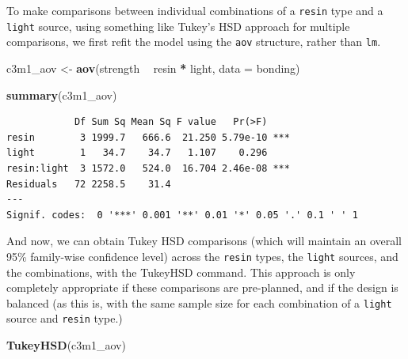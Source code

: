 \documentclass[]{book}
\newenvironment{Shaded}{\begin{snugshade}}{\end{snugshade}}
\newcommand{\KeywordTok}[1]{\textcolor[rgb]{0.13,0.29,0.53}{\textbf{#1}}}
\newcommand{\DataTypeTok}[1]{\textcolor[rgb]{0.13,0.29,0.53}{#1}}
\newcommand{\StringTok}[1]{\textcolor[rgb]{0.31,0.60,0.02}{#1}}
\newcommand{\OperatorTok}[1]{\textcolor[rgb]{0.81,0.36,0.00}{\textbf{#1}}}
\newcommand{\NormalTok}[1]{#1}
\theoremstyle{definition}
\theoremstyle{definition}
\theoremstyle{definition}
\theoremstyle{remark}
\begin{document}
To make comparisons between individual combinations of a \texttt{resin}
type and a \texttt{light} source, using something like Tukey's HSD
approach for multiple comparisons, we first refit the model using the
\texttt{aov} structure, rather than \texttt{lm}.

\begin{Shaded}
\begin{Highlighting}[]
\NormalTok{c3m1_aov <-}\StringTok{ }\KeywordTok{aov}\NormalTok{(strength }\OperatorTok{~}\StringTok{ }\NormalTok{resin }\OperatorTok{*}\StringTok{ }\NormalTok{light, }\DataTypeTok{data =}\NormalTok{ bonding)}

\KeywordTok{summary}\NormalTok{(c3m1_aov)}
\end{Highlighting}
\end{Shaded}

\begin{verbatim}
            Df Sum Sq Mean Sq F value   Pr(>F)    
resin        3 1999.7   666.6  21.250 5.79e-10 ***
light        1   34.7    34.7   1.107    0.296    
resin:light  3 1572.0   524.0  16.704 2.46e-08 ***
Residuals   72 2258.5    31.4                     
---
Signif. codes:  0 '***' 0.001 '**' 0.01 '*' 0.05 '.' 0.1 ' ' 1
\end{verbatim}

And now, we can obtain Tukey HSD comparisons (which will maintain an
overall 95\% family-wise confidence level) across the \texttt{resin}
types, the \texttt{light} sources, and the combinations, with the
TukeyHSD command. This approach is only completely appropriate if these
comparisons are pre-planned, and if the design is balanced (as this is,
with the same sample size for each combination of a \texttt{light}
source and \texttt{resin} type.)

\begin{Shaded}
\begin{Highlighting}[]
\KeywordTok{TukeyHSD}\NormalTok{(c3m1_aov)}
\end{Highlighting}
\end{Shaded}
\end{document}
